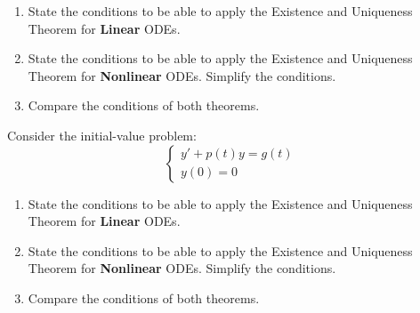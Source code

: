 \begin{exercises}
\begin{problist}
		\begin{enumerate}
			\item State the conditions to be able to apply the Existence and Uniqueness Theorem for \textbf{Linear} ODEs.
			\item State the conditions to be able to apply the Existence and Uniqueness Theorem for \textbf{Nonlinear} ODEs. Simplify the conditions.
			\item Compare the conditions of both theorems.
		\end{enumerate}


	\prob Consider the initial-value problem:
		$$ 
		\begin{cases}
			y' + p(t) y = g(t) \\
			y(0)=0		
		\end{cases}
		$$
		
		\begin{enumerate}
			\item State the conditions to be able to apply the Existence and Uniqueness Theorem for \textbf{Linear} ODEs.
			\item State the conditions to be able to apply the Existence and Uniqueness Theorem for \textbf{Nonlinear} ODEs. Simplify the conditions.
			\item Compare the conditions of both theorems.
		\end{enumerate}
	
	


	\end{problist}
\end{exercises}